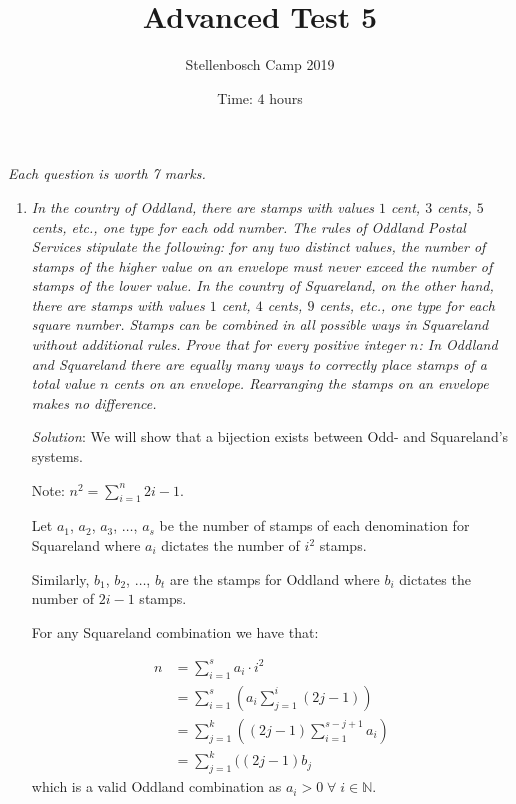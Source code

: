 \documentclass{article}
\title{Advanced Test 5}
\author{Stellenbosch Camp 2019}
\date{Time: $4$ hours}
\begin{document}
\maketitle
\thispagestyle{empty}

\hfill\textit{Each question is worth 7 marks.}

\vfill

\begin{enumerate}[1.]

  \item %
  \textit{In the country of Oddland, there are stamps with values $1$ cent, $3$ cents, $5$ cents, etc., one type for each odd number.
  The rules of Oddland Postal Services stipulate the following: for any two distinct values, the number of stamps of the higher value on an envelope must never exceed the number of stamps of the lower value.
  In the country of Squareland, on the other hand, there are stamps with values $1$ cent, $4$ cents, $9$ cents, etc., one type for each square number.
  Stamps can be combined in all possible ways in Squareland without additional rules.
  Prove that for every positive integer $n$:
  In Oddland and Squareland there are equally many ways to correctly place stamps of a total value $n$ cents on an envelope.
  Rearranging the stamps on an envelope makes no difference.
  }
  
  \textit{Solution}: 
  We will show that a bijection exists between Odd- and Squareland's systems.
  
  Note: $n^2 = \sum_{i = 1}^{n}2i - 1$.
  
  Let $a_1$, $a_2$, $a_3$, $\dots$, $a_s$ be the number of stamps of each denomination for Squareland where $a_i$ dictates the number of $i^2$ stamps.
  
  Similarly, $b_1$, $b_2$, $\dots$, $b_t$ are the stamps for Oddland where $b_i$ dictates the number of $2i - 1$ stamps.
  
  For any Squareland combination we have that:
  
  \begin{align*}
    n &= \sum_ {i = 1}^{s} a_i \cdot i^2 \\
    &= \sum_ {i = 1}^{s} (a_i \sum_{j = 1}^{i} (2j - 1) ) \\
    &= \sum_ {j = 1}^{k} ((2j - 1) \sum_{i = 1}^{s - j + 1}a_i) \\
    &= \sum_ {j = 1}^{k} ((2j - 1) b_j 
  \end{align*}
  which is a valid Oddland combination as $a_i > 0 \;\forall\; i \in \mathbb{N}$.
  

\end{enumerate}
\end{document}
